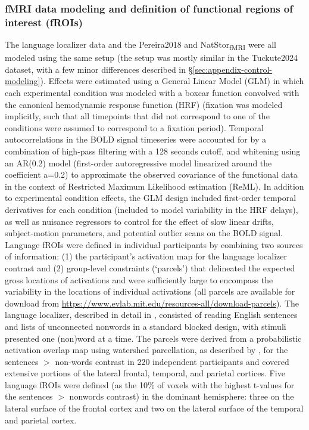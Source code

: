 \documentclass[11pt]{article}
\begin{document}
\subsubsection{fMRI data modeling and definition of functional regions of interest (fROIs)} \label{sec:appendix-modeling-frois}
The language localizer data and the Pereira2018 and NatStor\textsubscript{fMRI} were all modeled using the same setup (the setup was mostly similar in the Tuckute2024 dataset, with a few minor differences described in §\ref{sec:appendix-control-modeling}). Effects were estimated using a General Linear Model (GLM) in which each experimental condition was modeled with a boxcar function convolved with the canonical hemodynamic response function (HRF) (fixation was modeled implicitly, such that all timepoints that did not correspond to one of the conditions were assumed to correspond to a fixation period). Temporal autocorrelations in the BOLD signal timeseries were accounted for by a combination of high-pass filtering with a 128 seconds cutoff, and whitening using an AR(0.2) model (first-order autoregressive model linearized around the coefficient a=0.2) to approximate the observed covariance of the functional data in the context of Restricted Maximum Likelihood estimation (ReML). In addition to experimental condition effects, the GLM design included first-order temporal derivatives for each condition (included to model variability in the HRF delays), as well as nuisance regressors to control for the effect of slow linear drifts, subject-motion parameters, and potential outlier scans on the BOLD signal. Language fROIs were defined in individual participants \citep{fedorenko2010new, saxe2006divide} by combining two sources of information: (1) the participant’s activation map for the language localizer contrast \citep{fedorenko2010new} and (2) group-level constraints (‘parcels’) that delineated the expected gross locations of activations and were sufficiently large to encompass the variability in the locations of individual activations (all parcels are available for download from \url{https://www.evlab.mit.edu/resources-all/download-parcels}). The language localizer, described in detail in \citet{fedorenko2010new}, consisted of reading English sentences and lists of unconnected nonwords in a standard blocked design, with stimuli presented one (non)word at a time. The parcels were derived from a probabilistic activation overlap map using watershed parcellation, as described by \citet{fedorenko2010new}, for the sentences $>$ non-words contrast in 220 independent participants and covered extensive portions of the lateral frontal, temporal, and parietal cortices. Five language fROIs were defined (as the 10\% of voxels with the highest t-values for the sentences $>$ nonwords contrast) in the dominant hemisphere: three on the lateral surface of the frontal cortex and two on the lateral surface of the temporal and parietal cortex. 
\end{document}
